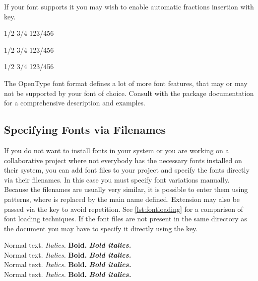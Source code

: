 If your font supports it you may wish to enable automatic fractions insertion
with  key.
\begin{example}
1/2 3/4 123/456

\setmainfont[
  Fractions=On,
]{Latin Modern Roman}
1/2 3/4 123/456

\setmainfont[
  Fractions=On,
]{Source Serif 4}
1/2 3/4 123/456
\end{example}

The OpenType font format defines a lot of more font features, that may or may not
be supported by your font of choice. Consult with the  package
documentation for a comprehensive description and examples.

\subsection{Specifying Fonts via Filenames}\label{ssec:fonts_filename}

If you do not want to install fonts in your system or you are working on a
collaborative project where not everybody has the necessary fonts installed on their system,
you can add font files to your project and specify the fonts directly via their filenames.
In this case you must specify
font variations manually. Because the filenames are usually very similar, it is
possible to enter them using \cargv{*} patterns, where \cargv{*} is replaced by
the main name defined. Extension may also be passed via the 
key to avoid repetition. See \autoref{lst:fontloading} for a comparison of font
loading techniques. If the font files are not present in the same directory as
the document you may have to specify it directly using the  key.
\begin{listing}
  \begin{example}[vertical_mode, examplewidth=0.8\linewidth]
\setmainfont{Source Serif 4}
Normal text. \textit{Italics.} \textbf{Bold.}
\textit{\textbf{Bold italics.}} \\

\setmainfont{SourceSerif4-Regular.otf}
Normal text. \textit{Italics.} \textbf{Bold.}
\textit{\textbf{Bold italics.}} \\

\setmainfont[
  ItalicFont=SourceSerif4-RegularIt.otf,
  BoldFont=SourceSerif4-Bold.otf,
  BoldItalicFont=SourceSerif4-BoldIt.otf,
]{SourceSerif4-Regular.otf}
Normal text. \textit{Italics.} \textbf{Bold.}
\textit{\textbf{Bold italics.}} \\

\setmainfont[
  Extension=.otf,
  UprightFont=*-Regular,
  ItalicFont=*-RegularIt,
  BoldFont=*-Bold,
  BoldItalicFont=*-BoldIt,
]{SourceSerif4}
Normal text. \textit{Italics.} \textbf{Bold.}
\textit{\textbf{Bold italics.}}
\end{example}
  \caption{Comparison of font loading with the 
    package.}\label{lst:fontloading}
\end{listing}


